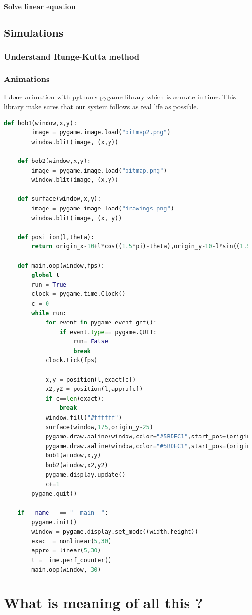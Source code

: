 \documentclass[11pt,a4paper]{article}
\begin{document}
\textbf{Solve linear equation}

\subsection{Simulations}
\label{sec:org51ee064}
\subsubsection{Understand Runge-Kutta method}
\label{sec:org724955b}

\subsubsection{Animations}
\label{sec:org129aeed}




I done animation with python's pygame library which is acurate in time. This library make sures that our system follows as real life as possible.

\begin{lstlisting}[language=Python]
    def bob1(window,x,y):
        image = pygame.image.load("bitmap2.png")
        window.blit(image, (x,y))

    def bob2(window,x,y):
        image = pygame.image.load("bitmap.png")
        window.blit(image, (x,y))

    def surface(window,x,y):
        image = pygame.image.load("drawings.png")
        window.blit(image, (x, y))
    
    def position(l,theta):
        return origin_x-10+l*cos((1.5*pi)-theta),origin_y-10-l*sin((1.5*pi)-theta)
    
    def mainloop(window,fps):
        global t
        run = True
        clock = pygame.time.Clock()
        c = 0
        while run:
            for event in pygame.event.get():
                if event.type== pygame.QUIT:
                    run= False
                    break
            clock.tick(fps)

            x,y = position(l,exact[c])
            x2,y2 = position(l,appro[c])
            if c==len(exact):
                break
            window.fill("#ffffff")
            surface(window,175,origin_y-25)
            pygame.draw.aaline(window,color="#5BDEC1",start_pos=(origin_x,origin_y),end_pos=(x+radius,y+radius))
            pygame.draw.aaline(window,color="#5BDEC1",start_pos=(origin_x,origin_y),end_pos=(x2+10,y2+10))
            bob1(window,x,y)
            bob2(window,x2,y2)
            pygame.display.update()
            c+=1
        pygame.quit()

    if __name__ == "__main__":
        pygame.init()
        window = pygame.display.set_mode((width,height))
        exact = nonlinear(5,30)
        appro = linear(5,30)
        t = time.perf_counter()
        mainloop(window, 30)
\end{lstlisting}

\section{What is meaning of all this ?}
\label{sec:org0b3d3c5}
\end{document}
